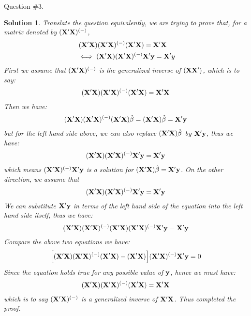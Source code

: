 \documentclass[11pt]{article}
\newtheorem{sol}{Solution}
\begin{document}
Question $\# 3.$
\begin{sol}
	Translate the question equivalently, we are trying to prove that, for a matrix denoted by $({\bf X}'{\bf X})^{(-)}$, 
	\begin{align*}
		&\ ({\bf X}'{\bf X})({\bf X}'{\bf X})^{(-)}({\bf X}'{\bf X}) = {\bf X}'{\bf X}\\
		&\iff ({\bf X}'{\bf X})({\bf X}'{\bf X})^{(-)}{\bf X}'{\bf y} = {\bf X}'y
	\end{align*}
	First we assume that $({\bf X}'{\bf X})^{(-)}$ is the generalized inverse of $({\bf X}{\bf X}')$, which is to say:
	\begin{align*}
		({\bf X}'{\bf X})({\bf X}'{\bf X})^{(-)}({\bf X}'{\bf X}) = {\bf X}'{\bf X}
	\end{align*}
	Then we have:
	\begin{align*}
		({\bf X}'{\bf X})({\bf X}'{\bf X})^{(-)}({\bf X}'{\bf X})\hat{{\bf \beta}} = ({\bf X}'{\bf X})\hat{{\bf \beta}} ={\bf X}'{\bf y}
	\end{align*}
	but for the left hand side above, we can also replace $({\bf X}'{\bf X})\hat{\beta}$ by ${\bf X}'{\bf y}$, thus we have:
	\begin{align*}
		({\bf X}'{\bf X})({\bf X}'{\bf X})^{(-)}{\bf X}'{\bf y} = {\bf X}'{\bf y}
	\end{align*}
	which means $({\bf X}'{\bf X})^{(-)}{\bf X}'{\bf y}$ is a solution for $({\bf X}'{\bf X})\hat{{\bf \beta}} = {\bf X}'{\bf y}$.\vskip 2mm
	On the other direction, we assume that
	\begin{align*}
		({\bf X}'{\bf X})({\bf X}'{\bf X})^{(-)}{\bf X}'{\bf y} = {\bf X}'{\bf y}
	\end{align*}
	We can substitute ${\bf X}'{\bf y}$ in terms of the left hand side of the equation into the left hand side itself, thus we have:
	\begin{align*}
		({\bf X}'{\bf X})({\bf X}'{\bf X})^{(-)}({\bf X}'{\bf X})({\bf X}'{\bf X})^{(-)}{\bf X}'{\bf y} = {\bf X}'{\bf y}
	\end{align*}
	Compare the above two equations we have:
	\begin{align*}
		\Big[({\bf X}'{\bf X})({\bf X}'{\bf X})^{(-)}({\bf X}'{\bf X}) - ({\bf X}'{\bf X})\Big]({\bf X}'{\bf X})^{(-)}{\bf X}'{\bf y} =0
	\end{align*}
	Since the equation holds true for any possible value of ${\bf y}$, hence we must have:
	\begin{align*}
		({\bf X}'{\bf X})({\bf X}'{\bf X})^{(-)}({\bf X}'{\bf X}) = {\bf X}'{\bf X}
	\end{align*}
	which is to say $({\bf X}'{\bf X})^{(-)}$ is a generalized inverse of ${\bf X}'{\bf X}$.\vskip 2mm
	Thus completed the proof.
\end{sol}
\end{document}
